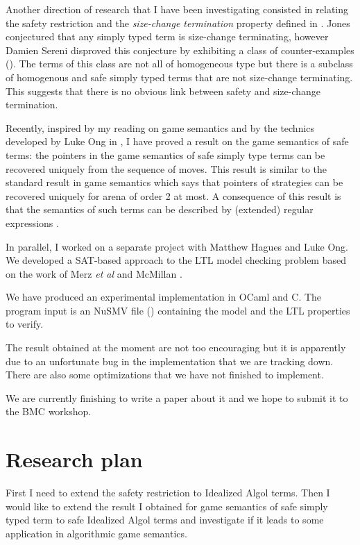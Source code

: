 Another direction of research that I have been investigating
consisted in relating the safety restriction and the
\emph{size-change termination} property defined in
\cite{jones01,jones04}. Jones conjectured that any simply typed term
is size-change terminating, however Damien Sereni disproved this
conjecture by exhibiting a class of counter-examples
(\cite{serenistypesct05}). The terms of this class are not all of
homogeneous type but there is a subclass of homogenous and safe
simply typed terms that are not size-change terminating. This
suggests that there is no obvious link between safety and
size-change termination.


Recently, inspired by my reading on game semantics
\cite{abramsky:game-semantics} and by the technics developed by Luke
Ong in \cite{OngLics2006}, I have proved a result on the game
semantics of safe terms: the pointers in the game semantics of safe
simply type terms can be recovered uniquely from the sequence of
moves. This result is similar to the standard result in game
semantics which says that pointers of strategies can be recovered
uniquely for arena of order 2 at most. A consequence of this result
is that the semantics of such terms can be described by (extended)
regular expressions \cite{ghicamccusker00}.



In parallel, I worked on a separate project with Matthew Hagues and
Luke Ong. We developed a SAT-based approach to the LTL model
checking problem based on the work of Merz \emph{et al}
\cite{hammer:truly} and McMillan \cite{DBLP:conf/cav/McMillan03}.

We have produced an experimental implementation in OCaml and C. The
program input is an NuSMV file (\cite{CAV02:nusmv}) containing the
model and the LTL properties to verify.

The result obtained at the moment are not too encouraging but it is
apparently due to an unfortunate bug in the implementation that we
are tracking down. There are also some optimizations that we have
not finished to implement.

We are currently finishing to write a paper about it and we hope to
submit it to the BMC workshop.

\chapter{Research plan}

First I need to extend the safety restriction to Idealized Algol
terms. Then I would like to extend the result I obtained for game
semantics of safe simply typed term to safe Idealized Algol terms
and investigate if it leads to some application in algorithmic game
semantics.


